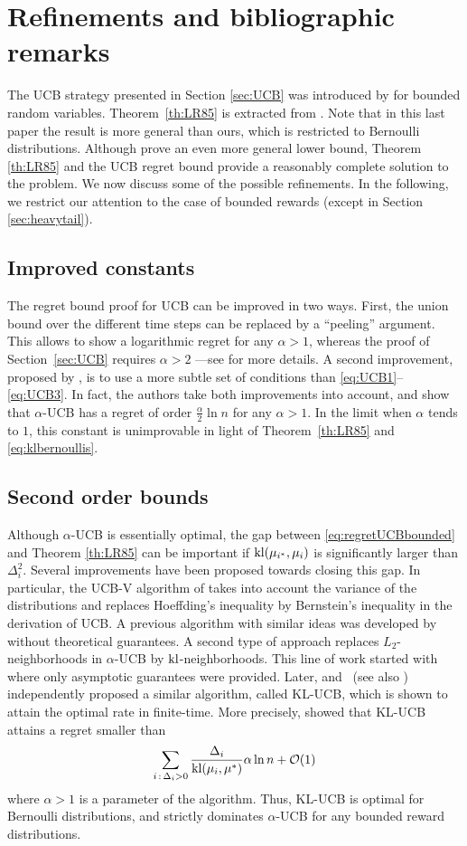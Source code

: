 \section{Refinements and bibliographic remarks}
The UCB strategy presented in Section \ref{sec:UCB} was introduced by \cite{ACF02} for bounded random variables. Theorem~\ref{th:LR85} is extracted from \cite{LR85}. Note that in this last paper the result is more general than ours, which is restricted to Bernoulli distributions. Although \cite{BK97} prove an even more general lower bound, Theorem \ref{th:LR85} and the UCB regret bound provide a reasonably complete solution to the problem. We now discuss some of the possible refinements. In the following, we restrict our attention to the case of bounded rewards (except in Section \ref{sec:heavytail}).

\subsection{Improved constants}
The regret bound proof for UCB can be improved in two ways. First, the union bound over the different time steps can be replaced by a ``peeling'' argument. This allows to show a logarithmic regret for any $\alpha > 1$, whereas the proof of Section~\ref{sec:UCB} requires $\alpha > 2$ ---see \cite[Section 2.2]{Bub10} for more details. A second improvement, proposed by \cite{GC11}, is to use a more subtle set of conditions than \eqref{eq:UCB1}--\eqref{eq:UCB3}. In fact, the authors take both improvements into account, and show that $\alpha$-UCB has a regret of order $\frac{\alpha}{2} \ln n$ for any $\alpha > 1$. In the limit when $\alpha$ tends to $1$, this constant is unimprovable in light of Theorem~\ref{th:LR85} and \eqref{eq:klbernoullis}.

\subsection{Second order bounds}
Although $\alpha$-UCB is essentially optimal, the gap between \eqref{eq:regretUCBbounded} and Theorem \ref{th:LR85} can be important if $\mathrm{kl}(\mu_{i^*}, \mu_i)$ is significantly larger than $\Delta_i^2$. Several improvements have been proposed towards closing this gap. In particular, the UCB-V algorithm of \cite{AMS09} takes into account the variance of the distributions and replaces Hoeffding's inequality by Bernstein's inequality in the derivation of UCB. A previous algorithm with similar ideas was developed by \cite{ACF02} without theoretical guarantees. A second type of approach replaces $L_2$-neighborhoods in $\alpha$-UCB by $\mathrm{kl}$-neighborhoods. This line of work started with \cite{HT10} where only asymptotic guarantees were provided. Later, \cite{GC11} and~\cite{MMS11} (see also \cite{CGMMS12}) independently proposed a similar algorithm, called KL-UCB, which is shown to attain the optimal rate in finite-time. More precisely, \cite{GC11} showed that KL-UCB attains a regret smaller than
\[
    \sum_{i \,:\, \Delta_i > 0} \frac{\Delta_i}{\mathrm{kl}(\mu_i,\mu^*)} \alpha \ln n + \mathcal{O}(1)
\]
where $\alpha >1$ is a parameter of the algorithm. Thus, KL-UCB is optimal for Bernoulli distributions, and strictly dominates $\alpha$-UCB for any bounded reward distributions.

